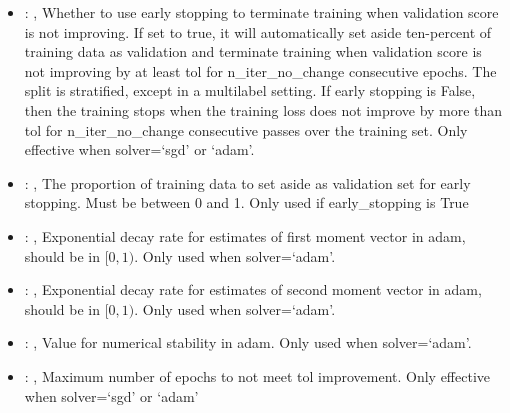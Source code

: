 \begin{itemize}
    \item {}: , 
      Whether to use early stopping to terminate training when validation score is not improving.
      If set to true, it will automatically set aside ten-percent of training data as validation and
      terminate                                                  training when validation score is
      not improving by at least tol for n\_iter\_no\_change consecutive
      epochs. The split is stratified, except in a multilabel setting. If early stopping is False,
      then                                                  the training stops when the training
      loss does not improve by more than tol for n\_iter\_no\_change
      consecutive passes over the training set. Only effective when solver=`sgd' or `adam'.

    \item {}: , 
      The proportion of training data to set aside as validation set for early stopping. Must be
      between 0 and 1.                                                  Only used if early\_stopping
      is True

    \item {}: , 
      Exponential decay rate for estimates of first moment vector in adam, should be in $[0, 1)$.
      Only used when solver=`adam'.

    \item {}: , 
      Exponential decay rate for estimates of second moment vector in adam, should be in $[0, 1)$.
      Only used when solver=`adam'.

    \item {}: , 
      Value for numerical stability in adam. Only used when solver=`adam'.

    \item {}: , 
      Maximum number of epochs to not meet tol improvement. Only effective when
      solver=`sgd' or `adam'
  \end{itemize}


